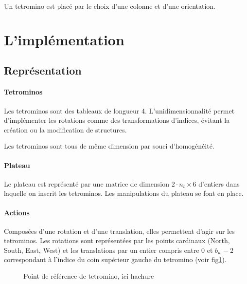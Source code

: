 \documentclass{report}
\begin{document}
Un tetromino est placé par le choix d'une colonne et d'une orientation.

\section{L'implémentation}

\subsection{Représentation}

\paragraph{Tetrominos}
Les tetrominos sont des tableaux de longueur 4. L'unidimensionnalité permet
d'implémenter les rotations comme des transformations d'indices, évitant la
création ou la modification de structures.

Les tetrominos sont tous de même dimension par souci d'homogénéité.

\paragraph{Plateau}
Le plateau est représenté par une matrice de dimension
\(2\cdot n_t \times 6\) d'entiers dans laquelle on inscrit les tetrominos. Les
manipulations du plateau se font en place.


\paragraph{Actions}
Composées d'une rotation et d'une translation, elles permettent d'agir sur les
tetrominos. Les rotations sont représentées par les points cardinaux
(North, South, East, West) et les translations par un entier compris entre 0 et
\(b_w - 2\) correspondant à l'indice du coin supérieur gauche du tetromino
(voir fig\ref{fig:tetref}).

\begin{figure}[h]
  \centering
  \qquad
  \caption{Point de référence de tetromino, ici hachure}\label{fig:tetref}
\end{figure}
\end{document}
